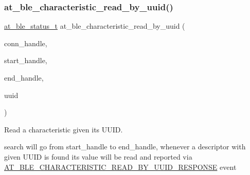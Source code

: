 \subsubsection{\texorpdfstring{at\_ble\_characteristic\_read\_by\_uuid()}{at\_ble\_characteristic\_read\_by\_uuid()}}
{\footnotesize\ttfamily \mbox{\hyperlink{group__error__codes__group_ga3b1db9b95feb157b3c188ca27fe76988}{at\+\_\+ble\+\_\+status\+\_\+t}} at\+\_\+ble\+\_\+characteristic\+\_\+read\+\_\+by\+\_\+uuid (\begin{DoxyParamCaption}\item[{\mbox{\hyperlink{at__ble__api_8h_abd23646d0c662860741f787efc8456f2}{at\+\_\+ble\+\_\+handle\+\_\+t}}}]{conn\+\_\+handle,  }\item[{\mbox{\hyperlink{at__ble__api_8h_abd23646d0c662860741f787efc8456f2}{at\+\_\+ble\+\_\+handle\+\_\+t}}}]{start\+\_\+handle,  }\item[{\mbox{\hyperlink{at__ble__api_8h_abd23646d0c662860741f787efc8456f2}{at\+\_\+ble\+\_\+handle\+\_\+t}}}]{end\+\_\+handle,  }\item[{\mbox{\hyperlink{structat__ble__uuid__t}{at\+\_\+ble\+\_\+uuid\+\_\+t}} $\ast$}]{uuid }\end{DoxyParamCaption})}



Read a characteristic given its U\+U\+ID. 

search will go from start\+\_\+handle to end\+\_\+handle, whenever a descriptor with given U\+U\+ID is found its value will be read and reported via \mbox{\hyperlink{at__ble__api_8h_a3324640b95f33169515f89738ed5baeba75f3f1f4b92e0be8234f9f785bf6f5f7}{A\+T\+\_\+\+B\+L\+E\+\_\+\+C\+H\+A\+R\+A\+C\+T\+E\+R\+I\+S\+T\+I\+C\+\_\+\+R\+E\+A\+D\+\_\+\+B\+Y\+\_\+\+U\+U\+I\+D\+\_\+\+R\+E\+S\+P\+O\+N\+SE}} event


